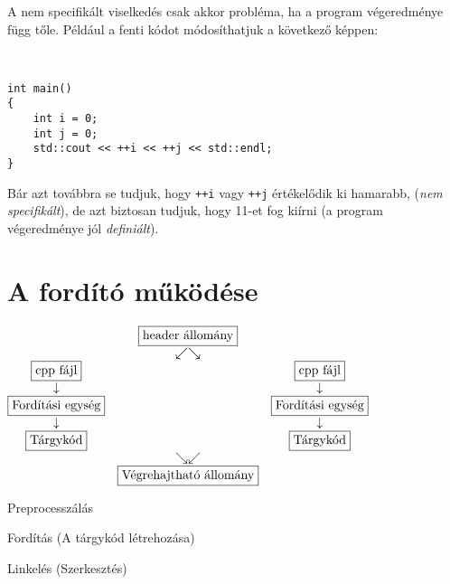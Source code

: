 \documentclass[a4paper,11.5pt]{article}
\begin{document}
	A nem specifikált viselkedés csak akkor probléma, ha a program végeredménye függ tőle. Például a fenti kódot módosíthatjuk a következő képpen:
	
	\begin{example}\ 
		
		\begin{lstlisting}
int main()
{
	int i = 0;
	int j = 0;
	std::cout << ++i << ++j << std::endl;
}
		\end{lstlisting}
	\end{example}
	Bár azt továbbra se tudjuk, hogy \texttt{++i} vagy \texttt{++j} értékelődik ki hamarabb, (\textit{nem specifikált}), de azt biztosan tudjuk, hogy 11-et fog kiírni (a program végeredménye jól \textit{definiált}).
	
	\section{A fordító működése}
	
	\begin{center}
		$\begin{matrix}
    &\fbox{\text{header állomány}}\\
		&\swarrow\searrow&\\
    \fbox{\text{cpp fájl}}&&\fbox{\text{cpp fájl}}\\
		\downarrow&&\downarrow\\
		\fbox{Fordítási egység}&&\fbox{Fordítási egység}\\
		\downarrow&&\downarrow\\
		\fbox{Tárgykód}&&\fbox{Tárgykód}\\
		&\searrow\swarrow&\\
		&\fbox{Végrehajtható állomány}&
	\end{matrix}$
	\end{center}
	\begin{compactitem}
		\item Preprocesszálás
    \item Fordítás (A tárgykód létrehozása)
    \item Linkelés (Szerkesztés)
	\end{compactitem}
\end{document}
